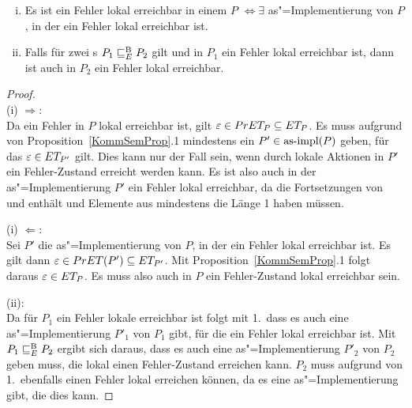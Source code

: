 \begin{Kor}\mbox{}
  \label{lokalFehlerErrKor}
  \begin{enumerate}[(i)]
    \item Es ist ein Fehler lokal erreichbar in einem \MEIO{} $P$
      $\Leftrightarrow \exists$ as"=Implementierung von $P$, in der ein Fehler
      lokal erreichbar ist.
    \item Falls für zwei \MEIO{}s $P_1 \sqsubseteq  _E^\mathrm{B} P_2$ gilt und in $P_1$ ein Fehler
      lokal erreichbar ist, dann ist auch in $P_2$ ein Fehler lokal erreichbar.
  \end{enumerate}
\end{Kor}
\begin{proof}\mbox{}\\
  (i) $\Rightarrow$:\\
  Da ein Fehler in $P$ lokal erreichbar ist, gilt $\varepsilon \in PrET _P
  \subseteq ET _P$. Es muss aufgrund von Proposition~\ref{KommSemProp}.1
  mindestens ein $P'\in\mathrm{as}\text{-}\mathrm{impl} (P)$ geben, für das $\varepsilon \in ET _{P'}$
  gilt. Dies kann nur der Fall sein, wenn durch lokale Aktionen in $P'$
  ein Fehler-Zustand erreicht werden kann. Es ist also auch in der
  as"=Implementierung $P'$ ein Fehler lokal erreichbar, da \ET{} die Fortsetzungen
  von \PrET{} und \MIT{} enthält und Elemente aus \MIT{} mindestens die Länge 1
  haben müssen.

  (i) $\Leftarrow$:\\
  Sei $P'$ die as"=Implementierung von $P$, in der ein Fehler lokal erreichbar
  ist. Es gilt dann $\varepsilon\in PrET (P') \subseteq ET _{P'}$. Mit
  Proposition~\ref{KommSemProp}.1 folgt daraus $\varepsilon \in ET _P$. Es
  muss also auch in $P$ ein Fehler-Zustand lokal erreichbar sein.

  (ii):\\
  Da für $P_1$ ein Fehler lokale erreichbar ist folgt mit 1.\, dass es auch
  eine as"=Implementierung $P'_1$ von $P_1$ gibt, für die ein Fehler lokal
  erreichbar ist. Mit $P_1 \sqsubseteq  _E^\mathrm{B} P_2$ ergibt sich daraus, dass es auch eine
  as"=Implementierung $P'_2$ von $P_2$ geben muss, die lokal einen
  Fehler-Zustand erreichen kann. $P_2$ muss aufgrund von 1.\ ebenfalls einen
  Fehler lokal erreichen können, da es eine as"=Implementierung gibt, die dies
  kann.
\end{proof}

